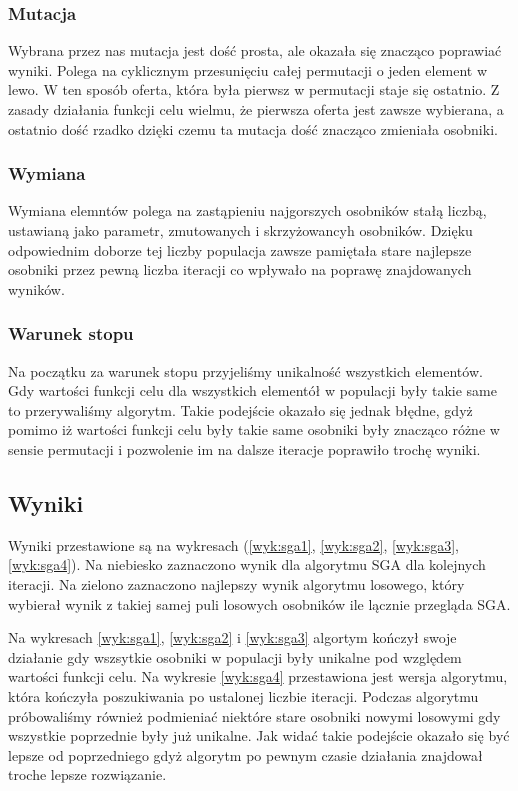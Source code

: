 \subsubsection{Mutacja}
Wybrana przez nas mutacja jest dość prosta, ale okazała się znacząco poprawiać wyniki.
Polega na cyklicznym przesunięciu całej permutacji o jeden element w lewo. 
W ten sposób oferta, która była pierwsz w permutacji staje się ostatnio. 
Z zasady działania funkcji celu wielmu, że pierwsza oferta jest zawsze wybierana, a ostatnio dość rzadko dzięki czemu ta mutacja dość znacząco zmieniała osobniki.

\subsubsection{Wymiana}
Wymiana elemntów polega na zastąpieniu najgorszych osobników stałą liczbą, ustawianą jako parametr, zmutowanych i skrzyżowancyh osobników.
Dzięku odpowiednim doborze tej liczby populacja zawsze pamiętała stare najlepsze osobniki przez pewną liczba iteracji co wpływało na poprawę znajdowanych wyników.

\subsubsection{Warunek stopu}
Na początku za warunek stopu przyjeliśmy unikalność wszystkich elementów.
Gdy wartości funkcji celu dla wszystkich elementół w populacji były takie same to przerywaliśmy algorytm.
Takie podejście okazało się jednak błędne, gdyż pomimo iż wartości funkcji celu były takie same osobniki były znacząco różne w sensie permutacji i pozwolenie im na dalsze iteracje poprawiło trochę wyniki.

\subsection{Wyniki}
Wyniki przestawione są na wykresach (\ref{wyk:sga1}, \ref{wyk:sga2}, \ref{wyk:sga3}, \ref{wyk:sga4}).
Na niebiesko zaznaczono wynik dla algorytmu SGA dla kolejnych iteracji.
Na zielono zaznaczono najlepszy wynik algorytmu losowego, który wybierał wynik z takiej samej puli losowych osobników ile lącznie przegląda SGA.


Na wykresach \ref{wyk:sga1}, \ref{wyk:sga2} i \ref{wyk:sga3} algortym kończył swoje działanie gdy wszsytkie osobniki w populacji były unikalne pod względem wartości funkcji celu.
Na wykresie \ref{wyk:sga4} przestawiona jest wersja algorytmu, która kończyła poszukiwania  po ustalonej liczbie iteracji.
Podczas algorytmu próbowaliśmy również podmieniać niektóre stare osobniki nowymi losowymi gdy wszystkie poprzednie były już unikalne.
Jak widać takie podejście okazało się być lepsze od poprzedniego gdyż algorytm po pewnym czasie działania znajdował troche lepsze rozwiązanie.


